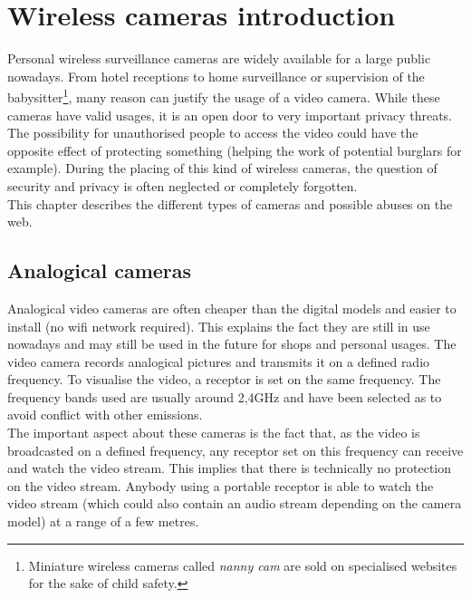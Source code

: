 
\chapter{Wireless cameras introduction}
\label{chap:wifi-cam}


Personal wireless surveillance cameras are widely available for a large public nowadays.
From hotel receptions to home surveillance or supervision of the babysitter\footnote{Miniature wireless cameras called \emph{nanny cam} are sold on specialised websites for the sake of child safety.}, many reason can justify the usage of a video camera.
While these cameras have valid usages, it is an open door to very important privacy threats.
The possibility for unauthorised people to access the video could have the opposite effect of protecting something (helping the work of potential burglars for example).
During the placing of this kind of wireless cameras, the question of security and privacy is often neglected or completely forgotten.\\

This chapter describes the different types of cameras and possible abuses on the web.

\section{Analogical cameras}
\label{sec:cam-analogic}

Analogical video cameras are often cheaper than the digital models and easier to install (no wifi network required).
This explains the fact they are still in use nowadays and may still be used in the future for shops and personal usages.
The video camera records analogical pictures and transmits it on a defined radio frequency.
To visualise the video, a receptor is set on the same frequency.
The frequency bands used are usually around 2,4GHz and have been selected as to avoid conflict with other emissions.\\

The important aspect about these cameras is the fact that, as the video is broadcasted on a defined frequency, any receptor set on this frequency can receive and watch the video stream.
This implies that there is technically no protection on the video stream.
Anybody using a portable receptor is able to watch the video stream (which could also contain an audio stream depending on the camera model) at a range of a few metres.\\

